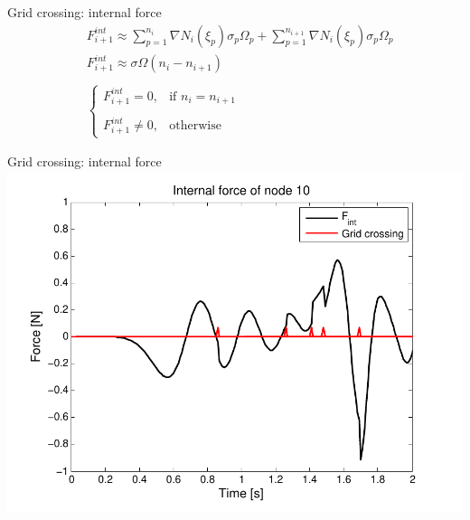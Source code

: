 \documentclass[mathserif,professionalfont]{beamer}
\begin{document}
\begin{frame}{Grid crossing: internal force}
 \begin{align}\nonumber
  & F^{int}_{i+1} \approx \sum_{p=1}^{n_i} \nabla N_i(\xi_p)\sigma_p \Omega_p + \sum_{p=1}^{n_{i+1}}\nabla N_i(\xi_p) \sigma_p \Omega_p\\ \nonumber
  & F^{int}_{i+1} \approx \sigma \Omega (n_i - n_{i+1})\\ \nonumber
  & \: \\ \nonumber
  & \begin{cases}F^{int}_{i+1} = 0, &\mbox{if } n_{i} = n_{i+1} \\
\: \\
F^{int}_{i+1} \neq 0, & \mbox{otherwise} \end{cases}  
 \end{align}
\end{frame}

\begin{frame}{Grid crossing: internal force}
\centering
\includegraphics[width=0.7\paperwidth,height=0.7\paperheight]{images/Grid_crossing}
\end{frame}
\end{document}
